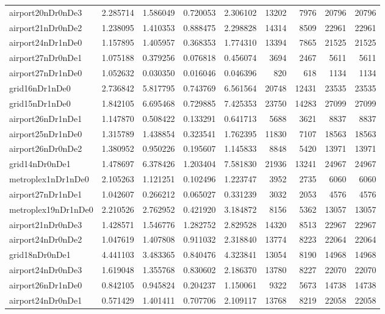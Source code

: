 \begin{longtable}{|l|r|r|r|r|r|r|r|r|}
airport20nDr0nDe3 & 2.285714 & 1.586049 & 0.720053 & 2.306102 & 13202 & 7976 & 20796 & 20796 \\
airport21nDr0nDe2 & 1.238095 & 1.410353 & 0.888475 & 2.298828 & 14314 & 8509 & 22961 & 22961 \\
airport24nDr1nDe0 & 1.157895 & 1.405957 & 0.368353 & 1.774310 & 13394 & 7865 & 21525 & 21525 \\
airport27nDr0nDe1 & 1.075188 & 0.379256 & 0.076818 & 0.456074 & 3694 & 2467 & 5611 & 5611 \\
airport27nDr1nDe0 & 1.052632 & 0.030350 & 0.016046 & 0.046396 & 820 & 618 & 1134 & 1134 \\
grid16nDr1nDe0 & 2.736842 & 5.817795 & 0.743769 & 6.561564 & 20748 & 12431 & 23535 & 23535 \\
grid15nDr1nDe0 & 1.842105 & 6.695468 & 0.729885 & 7.425353 & 23750 & 14283 & 27099 & 27099 \\
airport26nDr1nDe1 & 1.147870 & 0.508422 & 0.133291 & 0.641713 & 5688 & 3621 & 8837 & 8837 \\
airport25nDr1nDe0 & 1.315789 & 1.438854 & 0.323541 & 1.762395 & 11830 & 7107 & 18563 & 18563 \\
airport26nDr0nDe2 & 1.380952 & 0.950226 & 0.195607 & 1.145833 & 8848 & 5420 & 13971 & 13971 \\
grid14nDr0nDe1 & 1.478697 & 6.378426 & 1.203404 & 7.581830 & 21936 & 13241 & 24967 & 24967 \\
metroplex1nDr1nDe0 & 2.105263 & 1.121251 & 0.102496 & 1.223747 & 3952 & 2735 & 6060 & 6060 \\
airport27nDr1nDe1 & 1.042607 & 0.266212 & 0.065027 & 0.331239 & 3032 & 2053 & 4576 & 4576 \\
metroplex19nDr1nDe0 & 2.210526 & 2.762952 & 0.421920 & 3.184872 & 8156 & 5362 & 13057 & 13057 \\
airport21nDr0nDe3 & 1.428571 & 1.546776 & 1.282752 & 2.829528 & 14320 & 8513 & 22967 & 22967 \\
airport24nDr0nDe2 & 1.047619 & 1.407808 & 0.911032 & 2.318840 & 13774 & 8223 & 22064 & 22064 \\
grid18nDr0nDe1 & 4.441103 & 3.483365 & 0.840476 & 4.323841 & 13054 & 8190 & 14968 & 14968 \\
airport24nDr0nDe3 & 1.619048 & 1.355768 & 0.830602 & 2.186370 & 13780 & 8227 & 22070 & 22070 \\
airport26nDr1nDe0 & 0.842105 & 0.945824 & 0.204237 & 1.150061 & 9322 & 5673 & 14738 & 14738 \\
airport24nDr0nDe1 & 0.571429 & 1.401411 & 0.707706 & 2.109117 & 13768 & 8219 & 22058 & 22058 \\

\end{longtable}
